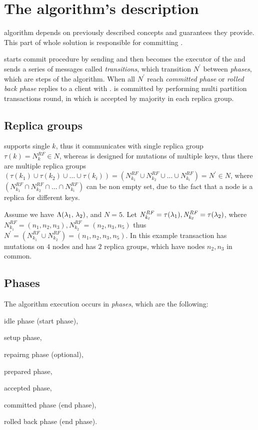 
\section{The algorithm's description}
\mpt algorithm depends on previously described \paxos concepts and guarantees they provide. 
This part of whole solution is responsible for committing \transaction. 

\client starts commit procedure by sending \txCommitMessage and then  becomes the executor of the \transaction and sends a series of messages called \emph{transitions}, which transition $\mathit{N}^'$ between \emph{phases}, which are steps of the algorithm. When all $\mathit{N}^'$ reach \emph{committed phase} or \emph{rolled back phase}  replies to a client with \txCommitResonseMessage.  \transaction is committed by performing multi partition transactions \paxos round, 
in which \txState is accepted by majority in each replica group.

\subsection{Replica groups}
\label{sec:mpp:replicaGroups}
\lwt supports single $k$, thus it communicates with single replica group $\tau(k) = N^{RF}_{k} \in \mathit{N}$, whereas \mpt is designed for mutations of multiple keys, thus there are multiple replica groups 
$(\tau(k_1) \cup \tau(k_2) \cup ... \cup \tau(k_i) ) = (N^{RF}_{k_1} \cup N^{RF}_{k_2} \cup ... \cup N^{RF}_{k_i} ) = \mathit{N^'} \in \mathit{N}$, where $(N^{RF}_{k_1} \cap N^{RF}_{k_2} \cap ... \cap N^{RF}_{k_i})$ can be non empty set, due to the fact that a node is a replica for different keys.

Assume we have $\text{$\Lambda$}(\text{$\lambda_{1}$, $\lambda_{2}$})$,  and $N=5$. Let $\mathit{N^{RF}_{k_1}} = \tau(\text{$\lambda_{1}$}), \mathit{N^{RF}_{k_2}} = \tau(\text{$\lambda_{2}$})$, where $\mathit{N^{RF}_{k_1}} = (n_1,n_2,n_3), \mathit{N^{RF}_{k_2}} = (n_2,n_3,n_5)$ thus $\mathit{N}^' = (N^{RF}_{k_1} \cup N^{RF}_{k_2}) = (n_1, n_2, n_3, n_5)$.
In this example transaction has mutations on $4$ nodes and has
$2$ replica groups, which have nodes $n_2, n_3$ in common.  


\subsection{Phases}
The algorithm execution occurs in \emph{phases}, which are the following: 
\begin{enumerate*}
\item idle phase (start phase),
\item setup phase,
\item repairng phase (optional),
\item prepared phase,
\item accepted phase,
\item committed phase (end phase),
\item rolled back phase (end phase).
\end{enumerate*}

